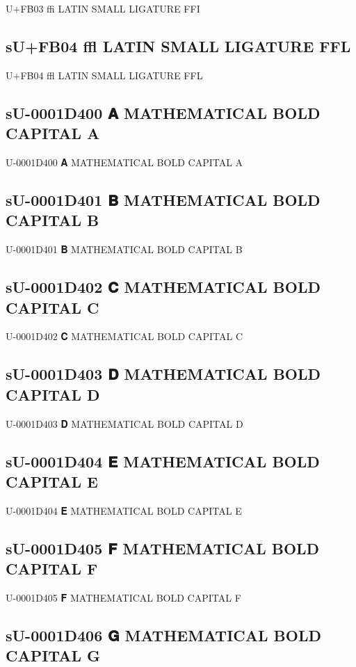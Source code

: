 U+FB03 ﬃ LATIN SMALL LIGATURE FFI

\subsection{sU+FB04 ﬄ LATIN SMALL LIGATURE FFL}

U+FB04 ﬄ LATIN SMALL LIGATURE FFL

\subsection{sU-0001D400 𝐀 MATHEMATICAL BOLD CAPITAL A}

U-0001D400 𝐀 MATHEMATICAL BOLD CAPITAL A

\subsection{sU-0001D401 𝐁 MATHEMATICAL BOLD CAPITAL B}

U-0001D401 𝐁 MATHEMATICAL BOLD CAPITAL B

\subsection{sU-0001D402 𝐂 MATHEMATICAL BOLD CAPITAL C}

U-0001D402 𝐂 MATHEMATICAL BOLD CAPITAL C

\subsection{sU-0001D403 𝐃 MATHEMATICAL BOLD CAPITAL D}

U-0001D403 𝐃 MATHEMATICAL BOLD CAPITAL D

\subsection{sU-0001D404 𝐄 MATHEMATICAL BOLD CAPITAL E}

U-0001D404 𝐄 MATHEMATICAL BOLD CAPITAL E

\subsection{sU-0001D405 𝐅 MATHEMATICAL BOLD CAPITAL F}

U-0001D405 𝐅 MATHEMATICAL BOLD CAPITAL F

\subsection{sU-0001D406 𝐆 MATHEMATICAL BOLD CAPITAL G}

